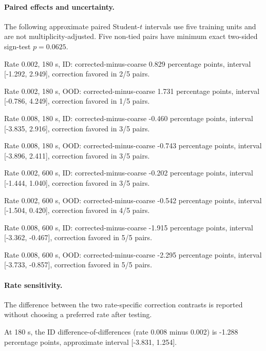 \paragraph{Paired effects and uncertainty.} The following approximate paired Student-$t$ intervals use five training units and are not multiplicity-adjusted. Five non-tied pairs have minimum exact two-sided sign-test $p=0.0625$.

Rate 0.002, 180 s, ID: corrected-minus-coarse 0.829 percentage points, interval [-1.292, 2.949], correction favored in 2/5 pairs.\par

Rate 0.002, 180 s, OOD: corrected-minus-coarse 1.731 percentage points, interval [-0.786, 4.249], correction favored in 1/5 pairs.\par

Rate 0.008, 180 s, ID: corrected-minus-coarse -0.460 percentage points, interval [-3.835, 2.916], correction favored in 3/5 pairs.\par

Rate 0.008, 180 s, OOD: corrected-minus-coarse -0.743 percentage points, interval [-3.896, 2.411], correction favored in 3/5 pairs.\par

Rate 0.002, 600 s, ID: corrected-minus-coarse -0.202 percentage points, interval [-1.444, 1.040], correction favored in 3/5 pairs.\par

Rate 0.002, 600 s, OOD: corrected-minus-coarse -0.542 percentage points, interval [-1.504, 0.420], correction favored in 4/5 pairs.\par

Rate 0.008, 600 s, ID: corrected-minus-coarse -1.915 percentage points, interval [-3.362, -0.467], correction favored in 5/5 pairs.\par

Rate 0.008, 600 s, OOD: corrected-minus-coarse -2.295 percentage points, interval [-3.733, -0.857], correction favored in 5/5 pairs.\par

\paragraph{Rate sensitivity.} The difference between the two rate-specific correction contrasts is reported without choosing a preferred rate after testing.

At 180 s, the ID difference-of-differences (rate 0.008 minus 0.002) is -1.288 percentage points, approximate interval [-3.831, 1.254].

